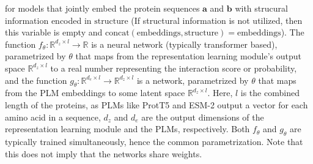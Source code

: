 \documentclass{article}
\begin{document}
for models that jointly embed the protein sequences \(\mathbf{a}\) and \(\mathbf{b}\) with strucural information encoded in \(\text{structure}\) (If structural information is not utilized, then this variable is empty and \(\text{concat}(\text{embeddings}, \text{structure}) = \text{embeddings}\)). The function \(f_\theta : \mathbb{R}^{d_z\times l}\rightarrow \mathbb{R}\) is a neural network (typically transformer based), parametrized by \(\theta\) that maps from the representation learning module's output space \(\mathbb{R}^{d_z\times l}\) to a real number representing the interaction score or probability, and the function \(g_\theta : \mathbb{R}^{d_e \times l}\rightarrow \mathbb{R}^{d_z\times l}\) is a network, parametrized by \(\theta\) that maps from the PLM embeddings to some latent space \(\mathbb{R}^{d_z\times l}\). Here, \(l\) is the combined length of the proteins, as PLMs like ProtT5 and ESM-2 output a vector for each amino acid in a sequence, \(d_z\) and \(d_e\) are the output dimensions of the representation learning module and the PLMs, respectively. Both \(f_\theta\) and \(g_\theta\) are typically trained simultaneously, hence the common parametrization. Note that this does not imply that the networks share weights.
\end{document}
